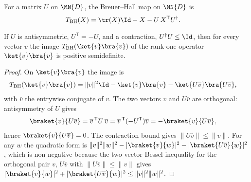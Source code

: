 \begin{definition}
    \label{def:breuer_hall_map}
    \leanok
    For a matrix $U$ on $\MN{D}$, the Breuer--Hall map on $\MN{D}$ is
    \begin{align}
        T_{\mathrm{BH}}(X) & =\tr(X) \Id-X-U\,X^{\mathsf T}U^{\dagger}.
        \notag
    \end{align}
\end{definition}

\begin{lemma}
    \label{lem:breuer_hall_rankone}
    \leanok
    If $U$ is antisymmetric, $U^{\mathsf T}=-U$, and a contraction,
    $U^{\dagger}U\le\Id$, then for every vector $v$ the image
    $T_{\mathrm{BH}}(\ket{v}\bra{v})$ of the rank-one operator $\ket{v}\bra{v}$ is
    positive semidefinite.
\end{lemma}

\begin{proof}
    \leanok
    On $\ket{v}\bra{v}$ the image is
    \begin{align}
        T_{\mathrm{BH}}(\ket{v}\bra{v})
         & =\lVert v\rVert^{2} \Id-\ket{v}\bra{v}
        -\ket{U\overline{v}}\bra{U\overline{v}},
        \notag
    \end{align}
    with $\overline{v}$ the entrywise conjugate of $v$. The two vectors $v$ and
    $U\overline{v}$ are orthogonal: antisymmetry of $U$ gives
    \begin{align}
        \braket{v}{U\overline{v}}
         & =\overline{v}^{\,\mathsf T}U\,\overline{v}
        =\overline{v}^{\,\mathsf T}(-U^{\mathsf T})\overline{v}
        =-\braket{v}{U\overline{v}},
        \notag
    \end{align}
    hence $\braket{v}{U\overline{v}}=0$. The contraction bound gives
    $\lVert U\overline{v}\rVert\le\lVert v\rVert$. For any
    $w$ the quadratic form is
    $\lVert v\rVert^{2}\lVert w\rVert^{2}
        -\lvert\braket{v}{w}\rvert^{2}
        -\lvert\braket{U\overline{v}}{w}\rvert^{2}$,
    which is non-negative because the two-vector Bessel inequality for the
    orthogonal pair $v$, $U\overline{v}$ with
    $\lVert U\overline{v}\rVert\le\lVert v\rVert$ gives
    $\lvert\braket{v}{w}\rvert^{2} +\lvert\braket{U\overline{v}}{w}\rvert^{2}
        \le\lVert v\rVert^{2}\lVert w\rVert^{2}$.
\end{proof}

